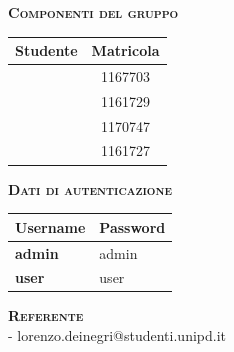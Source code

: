 {\begin{titlepage}
\begin{center}
\begin{large}
        	\end{large} 

      \vspace{1cm} 
      
     	\begin{center}
     		\textbf{\textsc{Componenti del gruppo}}\\ \bigskip
			\begin{tabular}{ l | c }
				\textbf{Studente}	& \textbf{Matricola} \\ \hline 
		 		\fiamma 					& 1167703 \\ 
		 		\ludo 						& 1161729 \\ 
		 		\perin 						& 1170747\\ 
				\toffo						& 1161727 \\
			\end{tabular}
		\end{center}
		
		 \vspace{1cm} 
		
		\textbf{\textsc{Dati di autenticazione}}\\ 
		\begin{center}
		\begin{tabular}{  l | l } 
				\textbf{Username} 		& \textbf{Password} \\ \hline 
		 		\textbf{admin} 				& admin 	\\ 
		 		\textbf{user}					& user 	\\ 
		\end{tabular}
	\end{center}

			
		\begin{center}
			\textbf{\textsc{Referente}} \\
			\ludo{} - lorenzo.deinegri@studenti.unipd.it \\
		\end{center}
			
		\end{center}
	\end{titlepage}
\pagebreak
}

